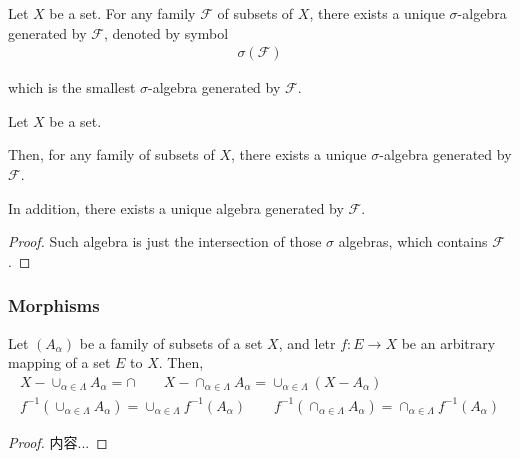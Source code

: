 \documentclass[Total.tex]{subfiles}
\begin{document}
					\begin{Def}
						Let $X$ be a set. For any family $\mathscr{F}$ of subsets of $X$, there exists a unique $\sigma$-algebra generated by $\mathscr{F}$, denoted by symbol
						\begin{gather*}
							\sigma(\mathscr{F})
						\end{gather*}
						
						which is the smallest $\sigma$-algebra generated by $\mathscr{F}$. 
					\end{Def}
					\begin{proposition}
						Let $X$ be a set. 
						
						Then, for any family of subsets of $X$, there exists a unique $\sigma$-algebra generated by $\mathscr{F}$.
						
						In addition, there exists a unique algebra generated by $\mathscr{F}$. 
					\end{proposition}
					\begin{proof}
						Such algebra is just the intersection of those $\sigma$ algebras, which contains $\mathscr{F}$. 
					\end{proof}
					
				\subsubsection{Morphisms}
					
					\begin{proposition}
						Let $(A_\alpha)$ be a family of subsets of a set $X$, and letr $f:E\rightarrow X$ be an arbitrary mapping of a set $E$ to $X$. Then,
						\begin{gather*}
							X-\cup_{\alpha\in \Lambda} A_\alpha=\cap\qquad X-\cap_{\alpha\in  \Lambda} A_\alpha=\cup_{\alpha\in \Lambda} (X-A_\alpha)\\
							f^{-1}(\cup_{\alpha\in \Lambda} A_\alpha)=\cup_{\alpha\in \Lambda} f^{-1}(A_\alpha)\qquad f^{-1}(\cap_{\alpha\in \Lambda} A_\alpha)=\cap_{\alpha\in \Lambda} f^{-1}(A_\alpha)
						\end{gather*}
					\end{proposition}
					\begin{proof}
						内容...
					\end{proof}
					
\end{document}
